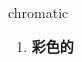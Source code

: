 
\begin{frame}
{\huge chromatic}
\begin{center}
\begin{enumerate}\Large
  \item \textbf{彩色的}
\end{enumerate}
\end{center}
\end{frame}
